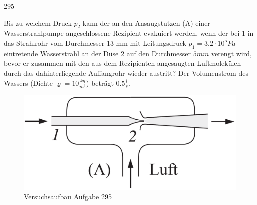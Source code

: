 \begin{auf}
    295
\end{auf}
Bis zu welchem Druck $p_2$ kann der an den Ansaugstutzen (A) einer Wasserstrahlpumpe angeschlossene Rezipient evakuiert werden, wenn der bei 1 in das Strahlrohr vom Durchmesser 13 mm mit Leitungsdruck $p_1=3.2\cdot 10^5Pa$ eintretende Wasserstrahl an der Düse 2 auf den Durchmesser $5mm$ verengt wird, bevor er zusammen mit den aus dem Rezipienten angesaugten Luftmolekülen durch das dahinterliegende Auffangrohr wieder austritt? Der Volumenstrom des Wassers (Dichte $\varrho=10\frac{kg}{m^3}$) beträgt $0.5\frac{l}{s}$.
\begin{figure}[h]
    \centering
    \includegraphics[width=0.7\linewidth]{images/295_0.png}
    \caption{Versuchsaufbau Aufgabe 295}
\end{figure}